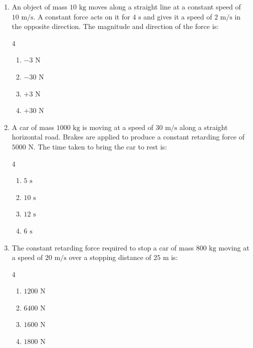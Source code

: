 \documentclass[11pt,a4paper]{article}
\begin{document}
\begin{enumerate}[label=\textbf{\arabic*.},leftmargin=18pt,itemsep=8pt]

  \item An object of mass $10\text{ kg}$ moves along a straight line at a constant speed of $10\text{ m/s}$. A constant force acts on it for $4\text{ s}$ and gives it a speed of $2\text{ m/s}$ in the opposite direction. The magnitude and direction of the force is:
  \begin{multicols}{4}
    \begin{enumerate}[label=(\Alph*)]
      \item $-3\text{ N}$
      \item $-30\text{ N}$
      \item $+3\text{ N}$
      \item $+30\text{ N}$
    \end{enumerate}
  \end{multicols}

  \item A car of mass $1000\text{ kg}$ is moving at a speed of $30\text{ m/s}$ along a straight horizontal road. Brakes are applied to produce a constant retarding force of $5000\text{ N}$. The time taken to bring the car to rest is:
  \begin{multicols}{4}
    \begin{enumerate}[label=(\Alph*)]
      \item $5\text{ s}$
      \item $10\text{ s}$
      \item $12\text{ s}$
      \item $6\text{ s}$
    \end{enumerate}
  \end{multicols}

  \item The constant retarding force required to stop a car of mass $800\text{ kg}$ moving at a speed of $20\text{ m/s}$ over a stopping distance of $25\text{ m}$ is:
  \begin{multicols}{4}
    \begin{enumerate}[label=(\Alph*)]
      \item $1200\text{ N}$
      \item $6400\text{ N}$
      \item $1600\text{ N}$
      \item $1800\text{ N}$
    \end{enumerate}
  \end{multicols}


\end{enumerate}
\end{document}
